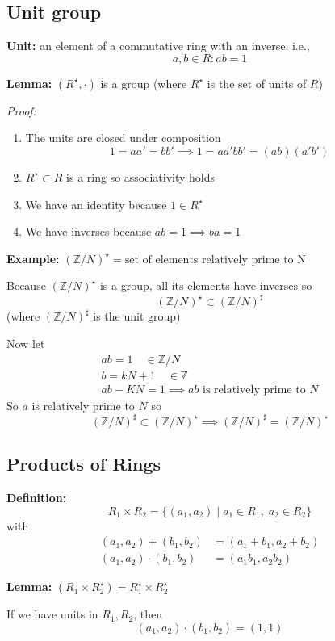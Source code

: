 \documentclass[12pt]{report}
\newcommand{\Z}{\mathbb{Z}}
\begin{document}
\subsection*{Unit group}
\textbf{Unit:} an element of a commutative ring with an inverse. i.e.,
\[a, b \in R: ab = 1 \]

\textbf{Lemma:} $(R^\star, \cdot)$ is a group (where $R^\star$ is the set of units of $R$)

\emph{Proof:}
\begin{enumerate}
    \item The units are closed under composition 
    \[1 = aa' = bb' \implies 1 = aa'bb' = (ab)(a'b')\]
    \item $R^\star \subset R$ is a ring so associativity holds
    \item We have an identity because $1 \in R^\star$
    \item We have inverses because $ab = 1 \implies ba=1$
\end{enumerate}

\textbf{Example:} $(\Z/N)^\star = \text{set of elements relatively prime to N}$

Because $(\Z/N)^\star$ is a group, all its elements have inverses so 
\[(\Z / N)^\star \subset (\Z/N)^\sharp\]
(where $(\Z/N)^\sharp$ is the unit group)

Now let 
\begin{align}
    ab = 1 \quad \in \Z/N\\
    b = kN + 1 \quad \in \Z\\
    ab - KN = 1 \implies \text{$ab$ is relatively prime to $N$}
\end{align}
So $a$ is relatively prime to $N$ so
\[(\Z/N)^\sharp \subset (\Z/N)^\star \implies (\Z/N)^\sharp = (\Z/N)^\star\]

\subsection*{Products of Rings}
\textbf{Definition:}
\[R_1 \times R_2 = \{(a_1, a_2) \; | \; a_1 \in R_1, \; a_2\in R_2\}\]
with 
\begin{align}
    (a_1, a_2) + (b_1, b_2) &= (a_1 + b_1, a_2 + b_2)\\
    (a_1, a_2) \cdot (b_1, b_2) &= (a_1 b_1, a_2 b_2)
\end{align}

\textbf{Lemma:} $(R_1 \times R_2^\star) = R_1^\star \times R_2^\star$

If we have units in $R_1, R_2$, then 
\[(a_1, a_2) \cdot (b_1, b_2) = (1, 1)\]
\end{document}
